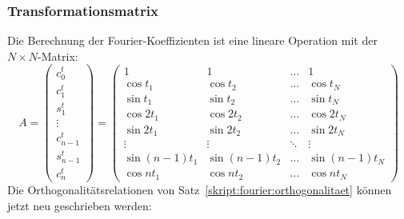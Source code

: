 \subsubsection{Transformationsmatrix}
Die Berechnung der Fourier-Koeffizienten ist eine lineare Operation
mit der $N\times N$-Matrix:
\[
A
=
\begin{pmatrix}
c_0^t\\
c_1^t\\
s_1^t\\
\vdots\\
c_{n-1}^t\\
s_{n-1}^t\\
c_n^t
\end{pmatrix}
=
\begin{pmatrix}
1           &1           &\dots &1            \\
\cos t_1    &\cos t_2    &\dots &\cos t_N     \\
\sin t_1    &\sin t_2    &\dots &\sin t_N     \\
\cos 2t_1   &\cos 2t_2   &\dots &\cos 2t_N    \\
\sin 2t_1   &\sin 2t_2   &\dots &\sin 2t_N    \\
\vdots      &\vdots      &\ddots&\vdots       \\
\sin(n-1)t_1&\sin(n-1)t_2&\dots &\sin(n-1)t_N \\
\cos nt_1   &\cos nt_2   &\dots &\cos nt_N    
\end{pmatrix}
\]
Die Orthogonalitätsrelationen von
Satz~\ref{skript:fourier:orthogonalitaet}
können jetzt neu geschrieben werden:
